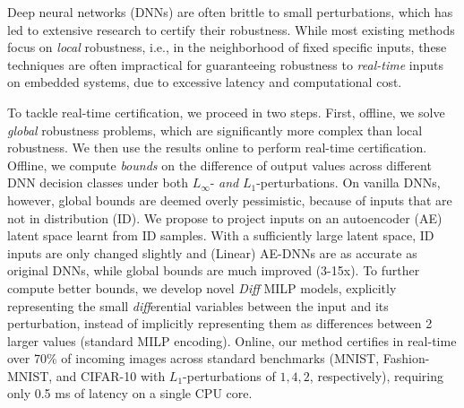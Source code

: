 Deep neural networks (DNNs) are often brittle to small perturbations, which has led to extensive research to certify their robustness. While most existing methods focus on {\em local} robustness, i.e., in the neighborhood of fixed specific inputs, these techniques are often impractical for guaranteeing robustness to {\em real-time} inputs on embedded systems, due to excessive latency and computational cost.

To tackle real-time certification, we proceed in two steps. First, offline, we solve {\em global} robustness problems, which are significantly more complex than local robustness. We then use the results online to perform real-time certification. Offline, we compute {\em bounds} on the difference of output values across different DNN decision classes under both $L_\infty$- {\em and} $L_1$-perturbations. 
On vanilla DNNs, however, global bounds are deemed overly pessimistic, because of inputs that are not in distribution (ID).
We propose to project inputs on an autoencoder (AE) latent space learnt from ID samples.
With a sufficiently large latent space, ID inputs are only changed slightly and (Linear) AE-DNNs are as accurate as original DNNs, while global bounds are much improved (3-15x).
To further compute better bounds, we develop novel {\em Diff} MILP models, explicitly representing the small {\em diff}erential variables between the input and its perturbation, instead of implicitly representing them as differences between 2 larger values (standard MILP encoding). 
Online, our method certifies in real-time over 70\% of incoming images across standard benchmarks (MNIST, Fashion-MNIST, and CIFAR-10 with $L_1$-perturbations of $1, 4, 2$, respectively), requiring only 0.5 ms of latency on a single CPU core.